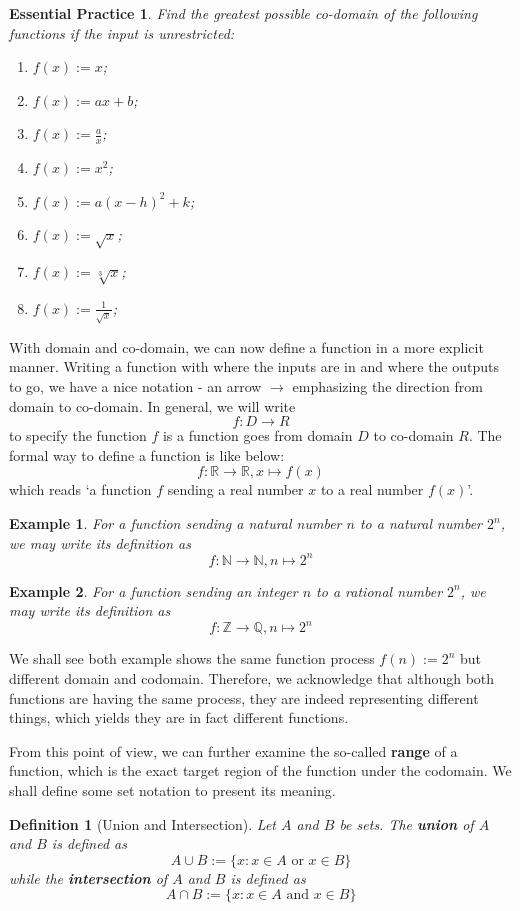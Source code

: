 \documentclass[12pt]{article}
\newtheorem{definition}{Definition}[section]
\newtheorem*{example}{Example}
\newtheorem{exercise}{Essential Practice}[subsubsection]
\begin{document}
    \begin{exercise}
        Find the greatest possible co-domain of the following functions if the input is unrestricted:\begin{enumerate}
            \item $f(x):=x$;
            \item $f(x):=ax+b$;
            \item $f(x):=\frac{a}{x}$;
            \item $f(x):=x^2$;
            \item $f(x):=a(x-h)^2+k$;
            \item $f(x):=\sqrt{x}$;
            \item $f(x):=\sqrt[3]{x}$;
            \item $f(x):=\frac{1}{\sqrt{x}}$;
        \end{enumerate}
    \end{exercise}

    With domain and co-domain, we can now define a function in a more explicit manner. Writing a function with where the inputs are in and where the outputs to go, we have a nice notation - an arrow $\to$ emphasizing the direction from domain to co-domain. In general, we will write $$f:D\to R$$ to specify the function $f$ is a function goes from domain $D$ to co-domain $R$. The formal way to define a function is like below: $$f:\mathbb{R}\to\mathbb{R}, x\mapsto f(x)$$ which reads `a function $f$ sending a real number $x$ to a real number $f(x)$'.

    \begin{example}
        For a function sending a natural number $n$ to a natural number $2^n$, we may write its definition as $$f:\mathbb{N}\to \mathbb{N}, n\mapsto 2^n$$
    \end{example}

    \begin{example}
        For a function sending an integer $n$ to a rational number $2^n$, we may write its definition as $$f:\mathbb{Z}\to \mathbb{Q}, n\mapsto 2^n$$
    \end{example}

    We shall see both example shows the same function process $f(n):=2^n$ but different domain and codomain. Therefore, we acknowledge that although both functions are having the same process, they are indeed representing different things, which yields they are in fact different functions.

    From this point of view, we can further examine the so-called \textbf{range} of a function, which is the exact target region of the function under the codomain. We shall define some set notation to present its meaning.
    \begin{definition}[Union and Intersection]
        Let $A$ and $B$ be sets. The \textbf{union} of $A$ and $B$ is defined as $$A\cup B:= \{x:x\in A \textrm{ or } x\in B\}$$ while the \textbf{intersection} of $A$ and $B$ is defined as $$A\cap B:= \{x:x\in A \textrm{ and } x\in B\}$$
    \end{definition}
\end{document}
